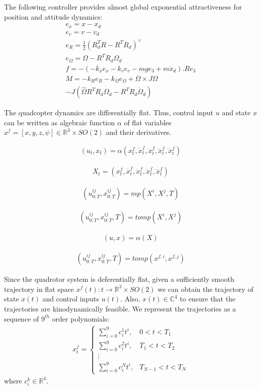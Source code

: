 \documentclass[conference]{IEEEtran}
\begin{document}
The following controller \cite{leegeometric} provides almost global exponential attractiveness for position and attitude dynamics:
\begin{gather}
    e_x = x - x_d \\
    e_v = v - v_d \\
    e_R = \frac{1}{2}(R^T_d R - R^T R_d)^{\vee} \\
    e_{\Omega} = \Omega - R^T R_d \Omega_d \\
    f = -(-k_x e_x - k_v e_v - mge_3 + m\ddot{x}_d).Re_3 \\
    \nonumber M = -k_R e_R - k_{\Omega} e_{\Omega} + \Omega \times J\Omega\\ - J (\hat{\Omega} R^T R_d \Omega_d - R^T R_d \dot{\Omega}_d)
\end{gather}

 The quadcopter dynamics are differentially flat. Thus, control input $u$ and state $x$ can be written as algebraic function $\alpha$ of flat variables $x^f = [x, y, z, \psi] \in \mathbb{R}^3 \times SO(2)$ and their derivatives.

\begin{align}
(u_t, x_t) = \alpha(x_t^f,\dot{x}_t^f,\ddot{x}_t^f,\dddot{x}_t^f,\ddddot{x}_t^f)
\end{align}

\begin{align}
X_t = (x_t^f,\dot{x}_t^f,\ddot{x}_t^f,\dddot{x}_t^f,\ddddot{x}_t^f)
\end{align}


\begin{align}
(u^{ij}_{0:T}, x^{ij}_{0:T}) = mp(X^i,X^j,T)
\end{align}

\begin{align}
(u^{ij}_{0:T}, x^{ij}_{0:T},T) = tomp(X^i,X^j)
\end{align}

\begin{align}
(u, x) = \alpha(X)
\end{align}


\begin{align}
(u^{ij}_{0:T}, x^{ij}_{0:T},T) = tomp(x^{f,i},x^{f,j})
\end{align}

Since the quadrotor system is deferentially flat, given a sufficiently smooth trajectory in flat space $x^f(t): t \to \mathbb{R}^3\times SO(2)$ we can obtain the trajectory of state $x(t)$ and control inputs $u(t)$. 
Also, $x(t) \in \mathbb{C}^4$ to ensure that the trajectories are kinodynamically feasible. 
We represent the trajectories as a sequence of $9^{th}$ order polynomials:
\begin{align}
x^f_t = 
\begin{cases}
    \sum_{i=0}^9 c_i^1 t^i, & 0 < t < T_1 \\
    \sum_{i=0}^9 c_i^2 t^i, & T_1 < t < T_2 \\
    \vdots\\
    \sum_{i=0}^9 c_i^N t^i, & T_{N-1} < t < T_N
\end{cases}
\end{align}
where $c^k_i\in\mathbb{R}^4$. 
\end{document}
